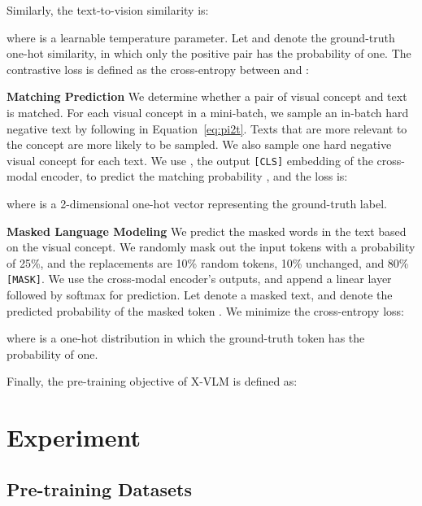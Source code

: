\documentclass[nohyperref]{article}
\theoremstyle{plain}
\theoremstyle{definition}
\theoremstyle{remark}
\begin{document}
Similarly, the text-to-vision similarity is: 

where  is a learnable temperature parameter. Let  and  denote the ground-truth one-hot similarity, in which only the positive pair has the probability of one. The contrastive loss is defined as the cross-entropy  between  and : 



\noindent\textbf{Matching Prediction} We determine whether a pair of visual concept and text is matched. For each visual concept in a mini-batch, we sample an in-batch hard negative text by following  in Equation~\ref{eq:pi2t}. Texts that are more relevant to the concept are more likely to be sampled. We also sample one hard negative visual concept for each text. We use , the output \texttt{[CLS]} embedding of the cross-modal encoder, to predict the matching probability , and the loss is:

where  is a 2-dimensional one-hot vector representing the ground-truth label.


\noindent\textbf{Masked Language Modeling} We predict the masked words in the text based on the visual concept. We randomly mask out the input tokens with a probability of 25\%, and the replacements are 10\% random tokens, 10\% unchanged, and 80\% \texttt{[MASK]}. We use the cross-modal encoder's outputs, and append a linear layer followed by softmax for prediction. Let  denote a masked text, and  denote the predicted probability of the masked token . We minimize the cross-entropy loss:

where  is a one-hot distribution in which the ground-truth token  has the probability of one. 


Finally, the pre-training objective of X-VLM is defined as:




\section{Experiment}

\subsection{Pre-training Datasets}
\label{sec:pretraindata}
\end{document}
